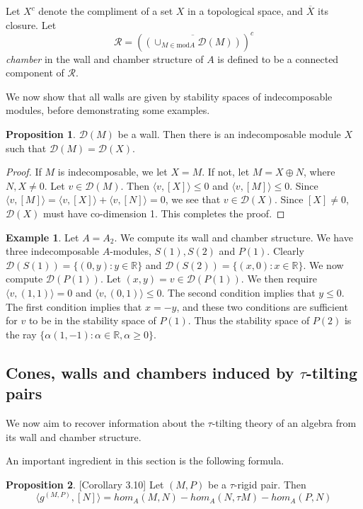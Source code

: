 \documentclass[]{article}
\theoremstyle{definition}
\newtheorem{proposition}{Proposition}[section]
\newtheorem{example}{Example}[section]
\newcommand{\tu}{\ensuremath{\tau}}
\begin{document}
Let $X^c$ denote the compliment of a set $X$ in a topological space, and $\overline{X}$ its closure. Let \[\mathcal{R} = (\overline{(\cup_{M \in \text{mod} A} \mathcal{D}(M))})^c\] \textit{chamber} in the wall and chamber structure of $A$ is defined to be a connected component of $\mathcal{R}$.

We now show that all walls are given by stability spaces of indecomposable modules, before demonstrating some examples.

\begin{proposition}
	$\mathcal{D}(M)$ be a wall. Then there is an indecomposable module $X$ such that $\mathcal{D}(M) = \mathcal{D}(X)$.
\end{proposition}

\begin{proof}
	If $M$ is indecomposable, we let $X = M$. If not, let $M = X\oplus N$, where $N,X \neq 0$. Let $v \in \mathcal{D}(M)$. Then $\langle v,[X]\rangle \leq 0$ and $\langle v,[M]\rangle \leq 0$. Since $\langle v,[M]\rangle = \langle v,[X]\rangle + \langle v,[N]\rangle = 0$, we see that $v \in \mathcal{D}(X)$. Since $[X] \neq 0$, $\mathcal{D}(X)$ must have co-dimension 1. This completes the proof.
\end{proof}

\begin{example}
	Let $A = A_2$. We compute its wall and chamber structure. We have three indecomposable $A$-modules, $S(1),S(2)$ and $P(1)$. Clearly $\mathcal{D}(S(1)) = \{(0,y): y \in \mathbb{R}\}$ and $\mathcal{D}(S(2)) = \{(x,0): x \in \mathbb{R}\}$. We now compute $\mathcal{D}(P(1))$. Let $(x,y) = v \in \mathcal{D}(P(1))$. We then require $\langle v,(1,1)\rangle = 0$ and $\langle v,(0,1)\rangle \leq 0$. The second condition implies that $y \leq 0$. The first condition implies that $x = -y$, and these two conditions are sufficient for $v$ to be in the stability space of $P(1)$. Thus the stability space of $P(2)$ is the ray $\{\alpha(1,-1) :  \alpha \in \mathbb{R}, \alpha \geq 0\}$. 
\end{example}


\subsection{Cones, walls and chambers induced by \tu-tilting pairs}
We now aim to recover information about the \tu-tilting theory of an algebra from its wall and chamber structure.

An important ingredient in this section is the following formula.
\begin{proposition}\cite{Br_stle_2019}[Corollary 3.10]
	Let $(M,P)$ be a \tu-rigid pair. Then
 \[\langle g^{(M,P)},[N]\rangle = hom_A(M,N) - hom_A(N,\tau M) - hom_A(P,N)\]
\end{proposition}
\end{document}
